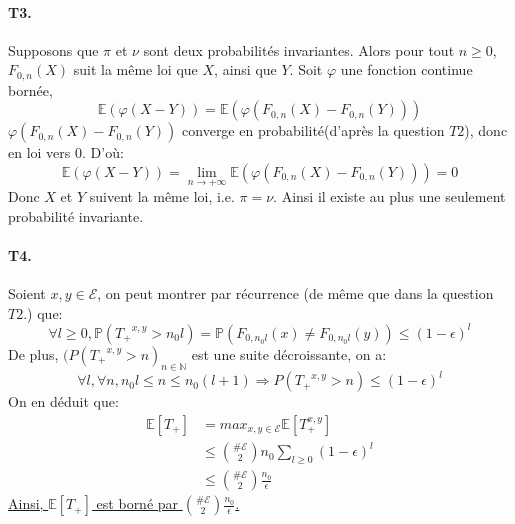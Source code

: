 \documentclass[11pt,a4paper,french]{article}
\def \P{\mathbb{P}}
\def \E{\mathcal{E}}
\begin{document}
\paragraph{T3.}
Supposons que $\pi$ et $\nu$ sont deux probabilités invariantes. 
Alors pour tout $n\geq0$, $F_{0,n}(X)$ suit la même loi que $X$, ainsi que $Y$.
Soit $\varphi$ une fonction continue bornée,
\[\mathbb{E}(\varphi(X-Y))=\mathbb{E}(\varphi(F_{0,n}(X)-F_{0,n}(Y)))\]
$\varphi(F_{0,n}(X)-F_{0,n}(Y))$ converge en probabilité(d'après la question $T2$), donc en loi vers $0$.
D'où:
\[\mathbb{E}(\varphi(X-Y))=\lim \limits_{n \rightarrow +\infty}\mathbb{E}(\varphi(F_{0,n}(X)-F_{0,n}(Y)))=0\]
Donc $X$ et $Y$ suivent la même loi, i.e. $\pi = \nu$.
Ainsi il existe au plus une seulement probabilité invariante.

\paragraph{T4.}
Soient $x,y \in \E$, on peut montrer par récurrence (de même que dans la question $T2.$) que:
\[\forall l\geq 0, \P({T_+}^{x,y}>n_0l)=\P(F_{0,n_0l}(x)\ne F_{0,n_0l}(y))\leq (1-\epsilon)^l\]
De plus, $(P({T_+}^{x,y}>n)_{n \in \mathbb{N}}$ est une suite décroissante, on a:
\[\forall l, \forall n, n_0l\leq n \leq n_0(l+1) \Rightarrow P({T_+}^{x,y}>n) \leq (1-\epsilon)^l \]
On en déduit que:
\begin{equation*}
\begin{split}
\mathbb{E}[T_+] &=max_{x,y \in \E} \mathbb{E}[T_+^{x,y}] \\
&\leq \binom{\# \E}{2} n_0 \sum_{l\geq 0} (1-\epsilon)^l \\
&\leq \binom{\# \E}{2} \frac{n_0}{\epsilon}
\end{split}
\end{equation*}
\underline{Ainsi, $\mathbb{E}[T_+]$ est borné par $\binom{\# \E}{2} \frac{n_0}{\epsilon}$.}
\end{document}
